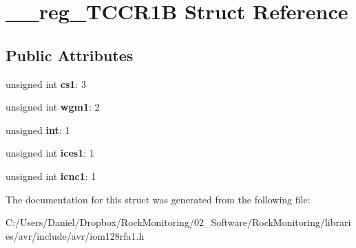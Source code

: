 \hypertarget{struct____reg___t_c_c_r1_b}{}\section{\+\_\+\+\_\+reg\+\_\+\+T\+C\+C\+R1B Struct Reference}
\label{struct____reg___t_c_c_r1_b}
\subsection*{Public Attributes}
\begin{DoxyCompactItemize}
\item 
unsigned int {\bfseries cs1}\+: 3\hypertarget{struct____reg___t_c_c_r1_b_a514083dca4c57d492c01befc8de56d43}{}\label{struct____reg___t_c_c_r1_b_a514083dca4c57d492c01befc8de56d43}

\item 
unsigned int {\bfseries wgm1}\+: 2\hypertarget{struct____reg___t_c_c_r1_b_a9138f1f9be15b4abd509da0a3e3d0584}{}\label{struct____reg___t_c_c_r1_b_a9138f1f9be15b4abd509da0a3e3d0584}

\item 
unsigned {\bfseries int}\+: 1\hypertarget{struct____reg___t_c_c_r1_b_a9026edb65d750eb61324a71b5a57f345}{}\label{struct____reg___t_c_c_r1_b_a9026edb65d750eb61324a71b5a57f345}

\item 
unsigned int {\bfseries ices1}\+: 1\hypertarget{struct____reg___t_c_c_r1_b_aca08d8c0b95d8478b28fa16ffb3763a1}{}\label{struct____reg___t_c_c_r1_b_aca08d8c0b95d8478b28fa16ffb3763a1}

\item 
unsigned int {\bfseries icnc1}\+: 1\hypertarget{struct____reg___t_c_c_r1_b_a5dec4b6fb1d0722be2b5a76dcd22f202}{}\label{struct____reg___t_c_c_r1_b_a5dec4b6fb1d0722be2b5a76dcd22f202}

\end{DoxyCompactItemize}


The documentation for this struct was generated from the following file\+:\begin{DoxyCompactItemize}
\item 
C\+:/\+Users/\+Daniel/\+Dropbox/\+Rock\+Monitoring/02\+\_\+\+Software/\+Rock\+Monitoring/libraries/avr/include/avr/iom128rfa1.\+h\end{DoxyCompactItemize}
